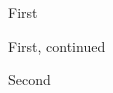 \documentclass{article}
\makeatletter
\let\@@caption\caption
\newcommand\contcaption{\addtocounter{\@captype}\m@ne \@@caption}
\makeatother
\begin{document}
\begin{figure}\caption{First}\end{figure}
\begin{figure}\contcaption{First, continued}\end{figure}
\begin{figure}\caption{Second}\end{figure}
\end{document}
